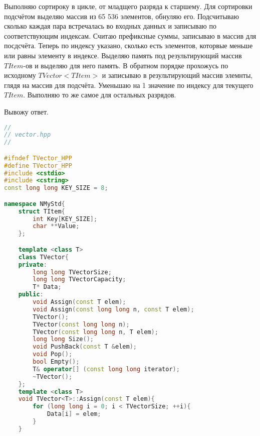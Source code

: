 Выполняю сортироку в цикле, от младщего разряда к старшему. Для сортировки подсчётом выделяю массив из 65 536 элементов, обнуляю его. Подсчитываю сколько каждая пара встречалась во входных данных и записываю по соответствующим индексам. Считаю префиксные суммы, записываю в массив для посдсчёта. Теперь по индексу указано, сколько есть элементов, которвые меньше или равны элементу в индексе. Выделяю память под результирующий массив $TItem$-ов и выделяю для него память. В обратном порядке прохожусь по исходному $TVector<TItem>$ и записываю в результирующий массив элемнты, глядя на массив для подсчёта. Уменьшаю на 1 значение по индексу для текущего $TItem$. Выполняю то же самое для остальных разрядов.

Вывожу ответ.

\pagebreak
\begin{lstlisting}[language=C++]
//
// vector.hpp
//

#ifndef TVector_HPP
#define TVector_HPP
#include <cstdio>
#include <cstring>
const long long KEY_SIZE = 8;

namespace NMyStd{
    struct TItem{
        int Key[KEY_SIZE];
        char **Value;
    };

    template <class T>
    class TVector{
    private:
        long long TVectorSize;
        long long TVectorCapacity;
        T* Data;
    public:
        void Assign(const T elem);
        void Assign(const long long n, const T elem);
        TVector();
        TVector(const long long n);
        TVector(const long long n, T elem);
        long long Size();
        void PushBack(const T &elem);
        void Pop();
        bool Empty();
        T& operator[] (const long long iterator);
        ~TVector();
    };
    template <class T>
    void TVector<T>::Assign(const T elem){
        for (long long i = 0; i < TVectorSize; ++i){
            Data[i] = elem;
        }
    }


\end{lstlisting}
